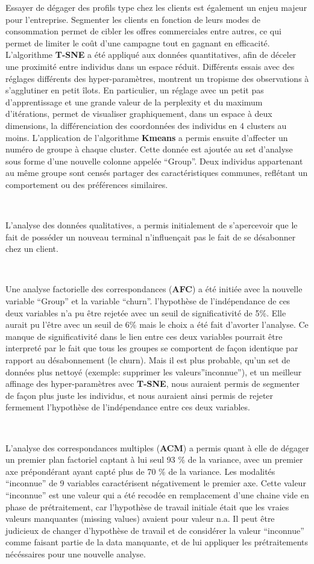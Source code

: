 \documentclass[]{imsart}
\numberwithin{equation}{section}
\theoremstyle{plain}
\begin{document}
Essayer de dégager des profils type chez les clients est également un enjeu majeur pour l'entreprise. Segmenter les clients en fonction de leurs modes de consommation permet de cibler les offres commerciales entre autres, ce qui permet de limiter le coût d'une campagne tout en gagnant en efficacité. L'algorithme \textbf{T-SNE} a été appliqué aux données quantitatives, afin de déceler une proximité entre individus dans un espace réduit. Différents essais avec des réglages différents des hyper-paramètres, montrent un tropisme des observations à s'agglutiner en petit îlots. En particulier, un réglage avec un petit pas d'apprentissage et une grande valeur de la perplexity et du maximum d'itérations, permet de visualiser graphiquement, dans un espace à deux dimensions, la différenciation des coordonnées des individus en 4 clusters au moins. L'application de l'algorithme \textbf{Kmeans} a permis ensuite d'affecter un numéro de groupe à chaque cluster. Cette donnée est ajoutée au set d'analyse sous forme d'une nouvelle colonne appelée ``Group''. Deux individus appartenant au même groupe sont censés partager des caractéristiques communes, reflétant un comportement ou des préférences similaires.

~

L'analyse des données qualitatives, a permis initialement de s'apercevoir que le fait de posséder un nouveau terminal n'influençait pas le fait de se désabonner chez un client.

~

Une analyse factorielle des correspondances (\textbf{AFC}) a été initiée avec la nouvelle variable ``Group'' et la variable ``churn''. l'hypothèse de l'indépendance de ces deux variables n'a pu être rejetée avec un seuil de significativité de 5\%. Elle aurait pu l'être avec un seuil de 6\% mais le choix a été fait d'avorter l'analyse. Ce manque de significativité dans le lien entre ces deux variables pourrait être interpreté par le fait que tous les groupes se comportent de façon identique par rapport au désabonnement (le churn). Mais il est plus probable, qu'un set de données plus nettoyé (exemple: supprimer les valeurs''inconnue''), et un meilleur affinage des hyper-paramètres avec \textbf{T-SNE}, nous auraient permis de segmenter de façon plus juste les individus, et nous auraient ainsi permis de rejeter fermement l'hypothèse de l'indépendance entre ces deux variables.

~

L'analyse des correspondances multiples (\textbf{ACM}) a permis quant à elle de dégager un premier plan factoriel captant à lui seul 93 \% de la variance, avec un premier axe prépondérant ayant capté plus de 70 \% de la variance. Les modalités ``inconnue'' de 9 variables caractérisent négativement le premier axe. Cette valeur ``inconnue'' est une valeur qui a été recodée en remplacement d'une chaine vide en phase de prétraitement, car l'hypothèse de travail initiale était que les vraies valeurs manquantes (missing values) avaient pour valeur n.a. Il peut être judicieux de changer d'hypothèse de travail et de considérer la valeur ``inconnue'' comme faisant partie de la data manquante, et de lui appliquer les prétraitements nécéssaires pour une nouvelle analyse.
\end{document}
